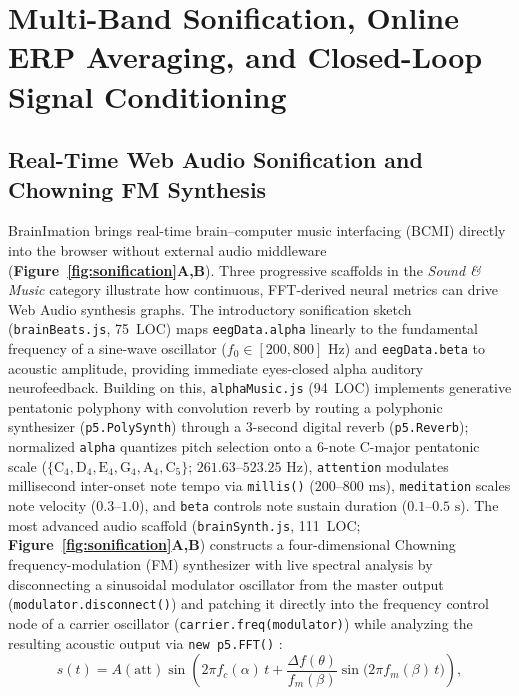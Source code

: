 \documentclass[10pt,twocolumn]{article}
\begin{document}
\section{Multi-Band Sonification, Online ERP Averaging, and Closed-Loop Signal Conditioning}

\subsection{Real-Time Web Audio Sonification and Chowning FM Synthesis}
BrainImation brings real-time brain--computer music interfacing (BCMI) directly into the browser without external audio middleware (\textbf{Figure~\ref{fig:sonification}A,B}). Three progressive scaffolds in the \emph{Sound \& Music} category illustrate how continuous, FFT-derived neural metrics can drive Web Audio synthesis graphs. The introductory sonification sketch (\texttt{brainBeats.js}, 75~LOC) maps \texttt{eegData.alpha} linearly to the fundamental frequency of a sine-wave oscillator ($f_0 \in [200, 800]\text{ Hz}$) and \texttt{eegData.beta} to acoustic amplitude, providing immediate eyes-closed alpha auditory neurofeedback. Building on this, \texttt{alphaMusic.js} (94~LOC) implements generative pentatonic polyphony with convolution reverb by routing a polyphonic synthesizer (\texttt{p5.PolySynth}) through a 3-second digital reverb (\texttt{p5.Reverb}); normalized \texttt{alpha} quantizes pitch selection onto a 6-note C-major pentatonic scale ($\{\text{C}_4, \text{D}_4, \text{E}_4, \text{G}_4, \text{A}_4, \text{C}_5\}$; $261.63\text{--}523.25\text{ Hz}$), \texttt{attention} modulates millisecond inter-onset note tempo via \texttt{millis()} ($200\text{--}800\text{ ms}$), \texttt{meditation} scales note velocity ($0.3\text{--}1.0$), and \texttt{beta} controls note sustain duration ($0.1\text{--}0.5\text{ s}$). The most advanced audio scaffold (\texttt{brainSynth.js}, 111~LOC; \textbf{Figure~\ref{fig:sonification}A,B}) constructs a four-dimensional Chowning frequency-modulation (FM) synthesizer with live spectral analysis by disconnecting a sinusoidal modulator oscillator from the master output (\texttt{modulator.disconnect()}) and patching it directly into the frequency control node of a carrier oscillator (\texttt{carrier.freq(modulator)}) while analyzing the resulting acoustic output via \texttt{new p5.FFT()} \citep{chowning1973synthesis,mccarthy2015p5}:
\begin{equation}
s(t) = A(\text{att}) \sin\!\left( 2\pi f_{c}(\alpha)\, t + \frac{\Delta f(\theta)}{f_{m}(\beta)} \sin\!\big(2\pi f_{m}(\beta)\, t\big) \right),
\end{equation}
\end{document}
